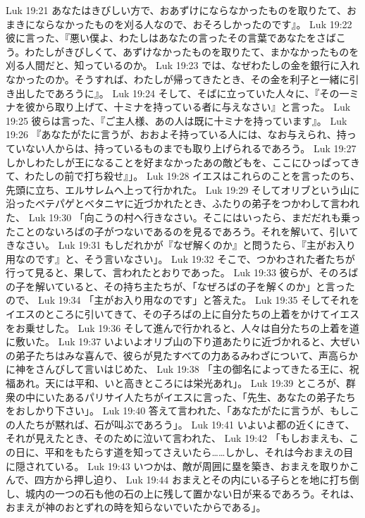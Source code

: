 Luk 19:21  あなたはきびしい方で、おあずけにならなかったものを取りたて、おまきにならなかったものを刈る人なので、おそろしかったのです』。
Luk 19:22  彼に言った、『悪い僕よ、わたしはあなたの言ったその言葉であなたをさばこう。わたしがきびしくて、あずけなかったものを取りたて、まかなかったものを刈る人間だと、知っているのか。
Luk 19:23  では、なぜわたしの金を銀行に入れなかったのか。そうすれば、わたしが帰ってきたとき、その金を利子と一緒に引き出したであろうに』。
Luk 19:24  そして、そばに立っていた人々に、『その一ミナを彼から取り上げて、十ミナを持っている者に与えなさい』と言った。
Luk 19:25  彼らは言った、『ご主人様、あの人は既に十ミナを持っています』。
Luk 19:26  『あなたがたに言うが、おおよそ持っている人には、なお与えられ、持っていない人からは、持っているものまでも取り上げられるであろう。
Luk 19:27  しかしわたしが王になることを好まなかったあの敵どもを、ここにひっぱってきて、わたしの前で打ち殺せ』」。
Luk 19:28  イエスはこれらのことを言ったのち、先頭に立ち、エルサレムへ上って行かれた。
Luk 19:29  そしてオリブという山に沿ったベテパゲとベタニヤに近づかれたとき、ふたりの弟子をつかわして言われた、
Luk 19:30  「向こうの村へ行きなさい。そこにはいったら、まだだれも乗ったことのないろばの子がつないであるのを見るであろう。それを解いて、引いてきなさい。
Luk 19:31  もしだれかが『なぜ解くのか』と問うたら、『主がお入り用なのです』と、そう言いなさい」。
Luk 19:32  そこで、つかわされた者たちが行って見ると、果して、言われたとおりであった。
Luk 19:33  彼らが、そのろばの子を解いていると、その持ち主たちが、「なぜろばの子を解くのか」と言ったので、
Luk 19:34  「主がお入り用なのです」と答えた。
Luk 19:35  そしてそれをイエスのところに引いてきて、その子ろばの上に自分たちの上着をかけてイエスをお乗せした。
Luk 19:36  そして進んで行かれると、人々は自分たちの上着を道に敷いた。
Luk 19:37  いよいよオリブ山の下り道あたりに近づかれると、大ぜいの弟子たちはみな喜んで、彼らが見たすべての力あるみわざについて、声高らかに神をさんびして言いはじめた、
Luk 19:38  「主の御名によってきたる王に、祝福あれ。天には平和、いと高きところには栄光あれ」。
Luk 19:39  ところが、群衆の中にいたあるパリサイ人たちがイエスに言った、「先生、あなたの弟子たちをおしかり下さい」。
Luk 19:40  答えて言われた、「あなたがたに言うが、もしこの人たちが黙れば、石が叫ぶであろう」。
Luk 19:41  いよいよ都の近くにきて、それが見えたとき、そのために泣いて言われた、
Luk 19:42  「もしおまえも、この日に、平和をもたらす道を知ってさえいたら……しかし、それは今おまえの目に隠されている。
Luk 19:43  いつかは、敵が周囲に塁を築き、おまえを取りかこんで、四方から押し迫り、
Luk 19:44  おまえとその内にいる子らとを地に打ち倒し、城内の一つの石も他の石の上に残して置かない日が来るであろう。それは、おまえが神のおとずれの時を知らないでいたからである」。
